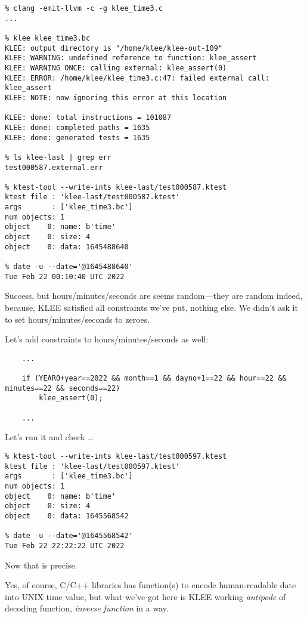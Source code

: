 

\begin{lstlisting}
% clang -emit-llvm -c -g klee_time3.c
...

% klee klee_time3.bc
KLEE: output directory is "/home/klee/klee-out-109"
KLEE: WARNING: undefined reference to function: klee_assert
KLEE: WARNING ONCE: calling external: klee_assert(0)
KLEE: ERROR: /home/klee/klee_time3.c:47: failed external call: klee_assert
KLEE: NOTE: now ignoring this error at this location

KLEE: done: total instructions = 101087
KLEE: done: completed paths = 1635
KLEE: done: generated tests = 1635

% ls klee-last | grep err
test000587.external.err

% ktest-tool --write-ints klee-last/test000587.ktest
ktest file : 'klee-last/test000587.ktest'
args       : ['klee_time3.bc']
num objects: 1
object    0: name: b'time'
object    0: size: 4
object    0: data: 1645488640

% date -u --date='@1645488640'
Tue Feb 22 00:10:40 UTC 2022
\end{lstlisting}

Success, but hours/minutes/seconds are seems random---they are random indeed, because, KLEE satisfied all constraints we've put, nothing else.
We didn't ask it to set hours/minutes/seconds to zeroes.

Let's add constraints to hours/minutes/seconds as well:

\begin{lstlisting}
	...

	if (YEAR0+year==2022 && month==1 && dayno+1==22 && hour==22 && minutes==22 && seconds==22)
		klee_assert(0);
	
	...
\end{lstlisting}

Let's run it and check \dots

\begin{lstlisting}
% ktest-tool --write-ints klee-last/test000597.ktest
ktest file : 'klee-last/test000597.ktest'
args       : ['klee_time3.bc']
num objects: 1
object    0: name: b'time'
object    0: size: 4
object    0: data: 1645568542

% date -u --date='@1645568542'
Tue Feb 22 22:22:22 UTC 2022
\end{lstlisting}

Now that is precise.

Yes, of course, C/C++ libraries has function(s) to encode human-readable date into UNIX time value, but what we've got here is KLEE working
\textit{antipode} of decoding function, \textit{inverse function} in a way.

